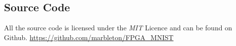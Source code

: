\subsection*{Source Code}

All the source code is licensed under the \emph{MIT} Licence and can be found on Github.
\url{https://github.com/marbleton/FPGA\_MNIST}
